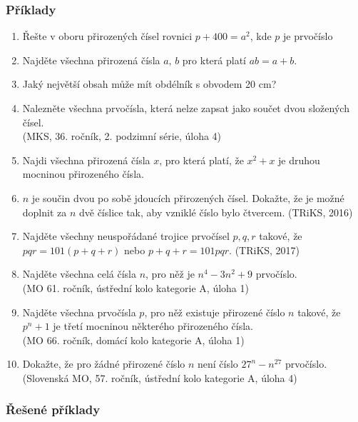 \documentclass[12pt,a4paper]{report}
\begin{document}
\subsubsection*{Příklady}		
\begin{enumerate}
	\item Řešte v oboru přirozených čísel rovnici $p+400=a^2$, kde $p$ je prvočíslo
	\item Najděte všechna přirozená čísla $a,\,b$ pro která platí $ab=a+b$.
	\item Jaký největší obsah může mít obdélník s obvodem 20 cm?
	\item Nalezněte všechna prvočísla, která nelze zapsat jako součet dvou složených čísel.\\ \hfill(MKS, 36. ročník, 2. podzimní série, úloha 4)
	\item Najdi všechna přirozená čísla $x$, pro která platí, že $x^2+x$ je druhou mocninou přirozeného čísla. 
	\item $n$ je součin dvou po sobě jdoucích přirozených čísel. Dokažte, že je možné doplnit za $n$ dvě číslice tak, aby vzniklé číslo bylo čtvercem. \hfill(TRiKS, 2016)
	\item Najděte  všechny neuspořádané trojice prvočísel $p, q, r$ takové, že $pqr = 101(p + q + r)$ nebo $p + q + r = 101pqr$. \hfill(TRiKS, 2017)
	\item Najděte všechna celá čísla $n$, pro něž je $n^4 - 3n^2 + 9$ prvočíslo. \\\hfill(MO 61. ročník, ústřední kolo kategorie A, úloha 1)
	\item Najděte všechna prvočísla $p$, pro něž existuje přirozené číslo $n$ takové, že $p^n + 1$ je třetí mocninou některého přirozeného čísla.\\ \hfill (MO 66. ročník, domácí kolo kategorie A, úloha 1)
	\item Dokažte, že pro žádné přirozené číslo $n$ není číslo $27^n - n^{27}$ prvočíslo. \\ \hfill(Slovenská MO, 57. ročník, ústřední kolo kategorie A, úloha 4)
\end{enumerate}	

\subsubsection*{Řešené příklady}	
	
\end{document}

